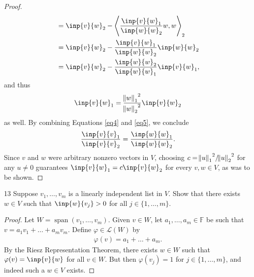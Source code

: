 \documentclass{extarticle}
\newenvironment{problem}[1]{\begin{prob*}{#1}{}}{\end{prob*}}
\newcommand{\F}{\mathbb{F}}
\DeclareMathOperator{\Span}{span}
\newcommand{\Hom}{\mathcal{L}}
\begin{document}
\begin{proof}
\begin{align*}
&= \inp{v}{w}_2 - \left\langle \frac{\inp{v}{w}_1}{\inp{w}{w}_2}w, w \right\rangle_2\\
&= \inp{v}{w}_2 - \frac{\inp{v}{w}_1}{\inp{w}{w}_2}\inp{w}{w}_2\\
&= \inp{v}{w}_2 - \frac{\inp{w}{w}_2}{\inp{w}{w}_1}\inp{v}{w}_1,
\end{align*}
and thus
\begin{equation}
\inp{v}{w}_1 = \frac{{\norm{w}_1}^2 }{{\norm{w}_2}^2}\inp{v}{w}_2 \label{eq5}
\end{equation}
as well.  By combining Equations \eqref{eq4} and \eqref{eq5}, we conclude 
\begin{equation*}
 \frac{\inp{v}{v}_1}{\inp{v}{v}_2} =  \frac{\inp{w}{w}_1}{\inp{w}{w}_2}.
\end{equation*}
Since $v$ and $w$ were arbitrary nonzero vectors in $V$, choosing $c = {\norm{u}_1}^2/{\norm{u}_2}^2$ for any $u\neq 0$ guarantees $\inp{v}{w}_1 = c\inp{v}{w}_2$ for every $v,w\in V$, as was to be shown.
\end{proof}

\begin{problem}{13}
Suppose $v_1,\dots, v_m$ is a linearly independent list in $V$.  Show that there exists $w\in V$ such that $\inp{w}{v_j} > 0$ for all $j \in \{1, \dots, m\}$.  
\end{problem}
\begin{proof}
Let $W = \Span(v_1,\dots, v_m)$.  Given $v\in W$, let $a_1,\dots, a_m\in\F$ be such that $v = a_1v_1 + \dots + a_mv_m$.  Define $\varphi\in\Hom(W)$ by
\begin{align*}
\varphi(v) = a_1 + \dots + a_m.
\end{align*}
By the Riesz Representation Theorem, there exists $w\in W$ such that $\varphi(v) = \inp{v}{w}$ for all $v\in W$.  But then $\varphi(v_j) = 1$ for $j \in\{1,\dots, m\}$, and indeed such a $w\in V$ exists.
\end{proof}
\end{document}
